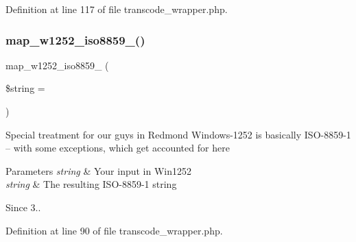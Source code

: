 Definition at line 117 of file transcode\+\_\+wrapper.\+php.

\hypertarget{transcode__wrapper_8php_ab498abf492a3888848b6b0166994d801}{}\label{transcode__wrapper_8php_ab498abf492a3888848b6b0166994d801} 
\subsubsection{\texorpdfstring{map\+\_\+w1252\+\_\+iso8859\+\_()}{map\_w1252\_iso8859\_1()}}
{\footnotesize\ttfamily map\+\_\+w1252\+\_\+iso8859\+\_ (\begin{DoxyParamCaption}\item[{}]{\$string = {\ttfamily \textquotesingle{}\textquotesingle{}} }\end{DoxyParamCaption})}

Special treatment for our guys in Redmond Windows-\/1252 is basically I\+S\+O-\/8859-\/1 -- with some exceptions, which get accounted for here 
\begin{DoxyParams}{Parameters}
{\em string} & Your input in Win1252 \\
\hline
{\em string} & The resulting I\+S\+O-\/8859-\/1 string \\
\hline
\end{DoxyParams}
\begin{DoxySince}{Since}
3.. 
\end{DoxySince}


Definition at line 90 of file transcode\+\_\+wrapper.\+php.

